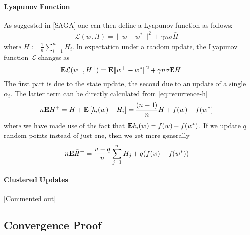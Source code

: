 \documentclass{article}
\newcommand{\E}{{\bf E}}
\begin{document}
\paragraph{Lyapunov Function} 
As suggested in [SAGA] one can then define a Lyapunov function as follows: 
\renewcommand{\L}{{\mathcal L}}
\begin{align}
\L(w,H) = \| w- w^*\|^2 + \gamma n \sigma   \bar H 
\end{align}
where $\bar H := \frac 1n \sum_{i=1}^n H_i$.  In expectation under a random update, the Lyapunov function $\L$ changes as
\begin{align}
\E \L(w^+,H^+) & = \E \| w^+ - w^*\|^2  + \gamma n \sigma  \E \bar H^+
\nonumber
\end{align}
The first part is due to the state update, the second due to an update of a single $\alpha_i$. The latter term can be directly calculated from \eqref{eq:recurrence-h}
\begin{align}
n \E \bar H^+ = \bar H + \E \left[ h_i(w) - H_i \right]
= \frac{(n-1)}{n} \bar H + f(w)-f(w^*)
\end{align}
where we have made use of the fact that $\E h_i(w) = f(w)-f(w^*)$.  If we update $q$ random points instead of just one, then we get more generally  
\begin{align}
n \E \bar H^+ = \frac{n-q}{n} \sum_{j=1}^n H_j + q (f(w) - f(w^*))
\end{align}

\paragraph{Clustered Updates}

[Commented out] 


\subsection{Convergence Proof}
\end{document}
